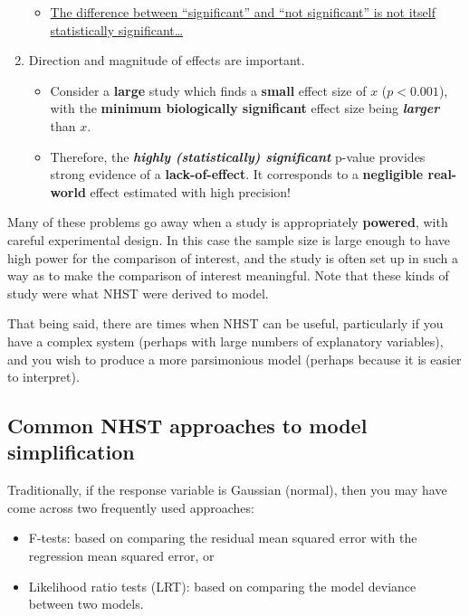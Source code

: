 \documentclass[]{book}
\providecommand{\tightlist}{%
  \setlength{\itemsep}{0pt}\setlength{\parskip}{0pt}}
\theoremstyle{definition}
\theoremstyle{definition}
\theoremstyle{definition}
\theoremstyle{remark}
\begin{document}
\begin{enumerate}
  \begin{itemize}
  \tightlist
  \item
    \href{http://www.tandfonline.com/doi/abs/10.1198/000313006X152649}{The
    difference between ``significant'' and ``not significant'' is not
    itself statistically significant\ldots{}}
  \end{itemize}
\item
  Direction and magnitude of effects are important.

  \begin{itemize}
  \tightlist
  \item
    Consider a \textbf{large} study which finds a \textbf{small} effect
    size of \(x\) (\(p < 0.001\)), with the \textbf{minimum biologically
    significant} effect size being \textbf{\emph{larger}} than \(x\).
  \item
    Therefore, the \textbf{\emph{highly (statistically) significant}}
    p-value provides strong evidence of a \textbf{lack-of-effect}. It
    corresponds to a \textbf{negligible real-world} effect estimated
    with high precision!
  \end{itemize}
\end{enumerate}

Many of these problems go away when a study is appropriately
\textbf{powered}, with careful experimental design. In this case the
sample size is large enough to have high power for the comparison of
interest, and the study is often set up in such a way as to make the
comparison of interest meaningful. Note that these kinds of study were
what NHST were derived to model.

That being said, there are times when NHST can be useful, particularly
if you have a complex system (perhaps with large numbers of explanatory
variables), and you wish to produce a more parsimonious model (perhaps
because it is easier to interpret).

\subsection{Common NHST approaches to model
simplification}\label{common-nhst-approaches-to-model-simplification}

Traditionally, if the response variable is Gaussian (normal), then you
may have come across two frequently used approaches:

\begin{itemize}
\tightlist
\item
  F-tests: based on comparing the residual mean squared error with the
  regression mean squared error, or
\item
  Likelihood ratio tests (LRT): based on comparing the model deviance
  between two models.
\end{itemize}
\end{document}
